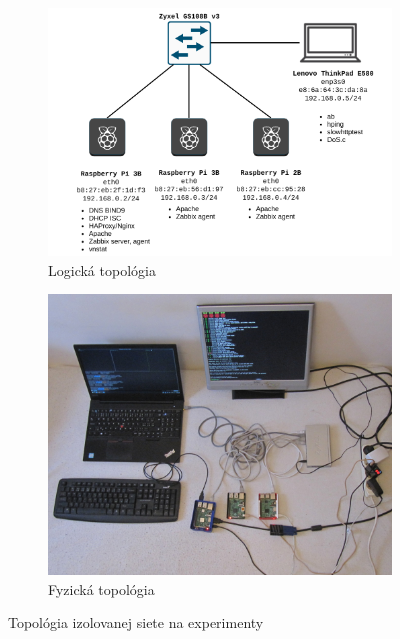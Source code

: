 \documentclass[12pt, a4paper]{article}
\begin{document}
\begin{figure}[h]
	\centering
	\begin{subfigure}[t]{.48\textwidth}
  		\centering
  		\includegraphics[width=\textwidth]{images/topology.png}
  		\caption{Logická topológia}
  		\label{net-ip}
	\end{subfigure}
	\begin{subfigure}[t]{.48\textwidth}
  		\centering
  		\includegraphics[width=\textwidth]{images/net.JPG}
  		\caption{Fyzická topológia}
  		\label{net-fyzicky}
	\end{subfigure}
	\caption{Topológia izolovanej siete na experimenty}
\end{figure}
\end{document}
